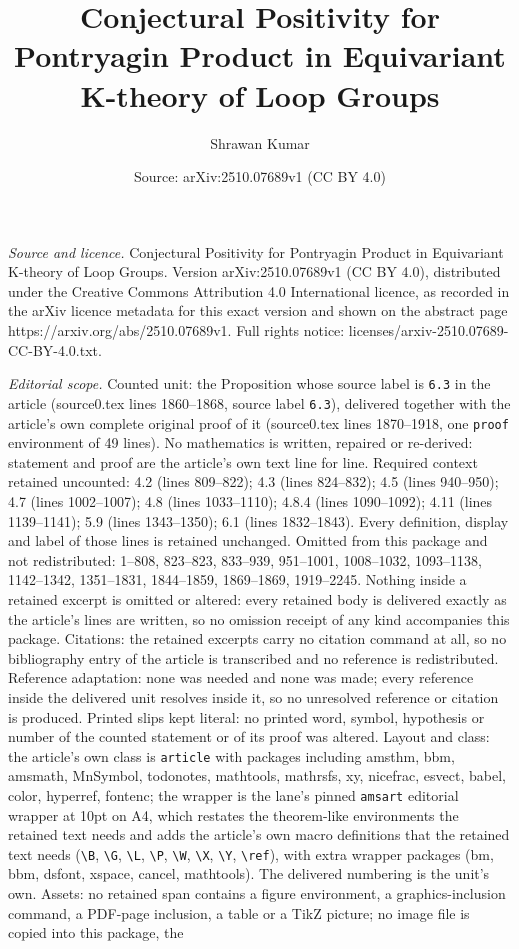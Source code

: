 \documentclass[10pt,a4paper]{amsart}
\title[Conjectural Positivity for Pontryagin Product in Equivariant]{Conjectural Positivity for Pontryagin Product in Equivariant K-theory of Loop Groups}
\author{Shrawan Kumar}
\date{Source: arXiv:2510.07689v1 (CC BY 4.0)}
\begin{document}
\maketitle

\noindent\emph{Source and licence.} Conjectural Positivity for Pontryagin Product in Equivariant K-theory of Loop Groups. Version arXiv:2510.07689v1 (CC BY 4.0), distributed under the Creative Commons Attribution 4.0 International licence, as recorded in the arXiv licence metadata for this exact version and shown on the abstract page https://arxiv.org/abs/2510.07689v1. Full rights notice: licenses/arxiv-2510.07689-CC-BY-4.0.txt.\par\smallskip

\noindent\textit{Editorial scope.} Counted unit: the Proposition whose source label is \texttt{6.3} in the article (source0.tex lines 1860--1868, source label \texttt{6.3}), delivered together with the article's own complete original proof of it (source0.tex lines 1870--1918, one \texttt{proof} environment of 49 lines). No mathematics is written, repaired or re-derived: statement and proof are the article's own text line for line. Required context retained uncounted: 4.2 (lines 809--822); 4.3 (lines 824--832); 4.5 (lines 940--950); 4.7 (lines 1002--1007); 4.8 (lines 1033--1110); 4.8.4 (lines 1090--1092); 4.11 (lines 1139--1141); 5.9 (lines 1343--1350); 6.1 (lines 1832--1843). Every definition, display and label of those lines is retained unchanged. Omitted from this package and not redistributed: 1--808, 823--823, 833--939, 951--1001, 1008--1032, 1093--1138, 1142--1342, 1351--1831, 1844--1859, 1869--1869, 1919--2245. Nothing inside a retained excerpt is omitted or altered: every retained body is delivered exactly as the article's lines are written, so no omission receipt of any kind accompanies this package. Citations: the retained excerpts carry no citation command at all, so no bibliography entry of the article is transcribed and no reference is redistributed. Reference adaptation: none was needed and none was made; every reference inside the delivered unit resolves inside it, so no unresolved reference or citation is produced. Printed slips kept literal: no printed word, symbol, hypothesis or number of the counted statement or of its proof was altered. Layout and class: the article's own class is \texttt{article} with packages including amsthm, bbm, amsmath, MnSymbol, todonotes, mathtools, mathrsfs, xy, nicefrac, esvect, babel, color, hyperref, fontenc; the wrapper is the lane's pinned \texttt{amsart} editorial wrapper at 10pt on A4, which restates the theorem-like environments the retained text needs and adds the article's own macro definitions that the retained text needs (\texttt{\textbackslash B}, \texttt{\textbackslash G}, \texttt{\textbackslash L}, \texttt{\textbackslash P}, \texttt{\textbackslash W}, \texttt{\textbackslash X}, \texttt{\textbackslash Y}, \texttt{\textbackslash ref}), with extra wrapper packages (bm, bbm, dsfont, xspace, cancel, mathtools). The delivered numbering is the unit's own. Assets: no retained span contains a figure environment, a graphics-inclusion command, a PDF-page inclusion, a table or a TikZ picture; no image file is copied into this package, the 
\end{document}
